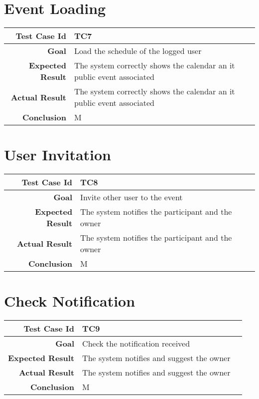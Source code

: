 \section{Event Loading}
\begin{tabularx}{\linewidth}{|r|X|X|}
\hline   {\bf Test Case Id} &  TC7\\
  \hline  {\bf Goal} & Load the schedule of the logged user\\
 
  \hline  {\bf Expected Result} & The system correctly shows the calendar an it public event associated\\
  \hline  {\bf Actual Result} & The system correctly shows the calendar an it public event associated\\
  \hline  {\bf Conclusion} & M\\
  \hline
  
\end{tabularx}

\section{User Invitation}
\begin{tabularx}{\linewidth}{|r|X|X|}
\hline   {\bf Test Case Id} &  TC8\\
  \hline  {\bf Goal} & Invite other user to the event\\
 
  \hline  {\bf Expected Result} & The system notifies the participant and the owner\\
  \hline  {\bf Actual Result} & The system notifies the participant and the owner\\
  \hline  {\bf Conclusion} & M\\
  \hline
  
\end{tabularx}

\section{Check Notification}
\begin{tabularx}{\linewidth}{|r|X|X|}
\hline   {\bf Test Case Id} &  TC9\\
  \hline  {\bf Goal} & Check the notification received\\
  
  \hline  {\bf Expected Result} & The system notifies and suggest the owner\\
  \hline  {\bf Actual Result} & The system notifies and suggest the owner\\
  \hline  {\bf Conclusion} & M\\
  \hline
  
\end{tabularx}
